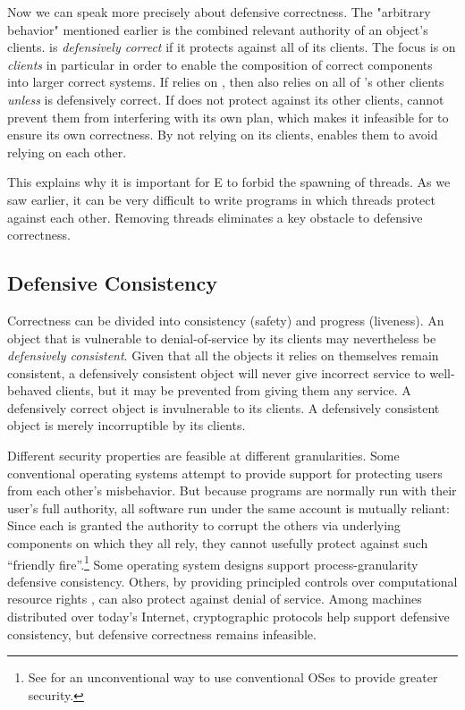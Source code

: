 \documentclass{llncs}
\begin{document}
Now we can speak more precisely about defensive correctness. The
"arbitrary behavior" mentioned earlier is the combined relevant
authority of an object's clients.  is \emph{defensively
correct} if it protects against all of its clients.  The focus is on
\emph{clients} in particular in order to enable the composition of
correct components into larger correct systems. If  relies on
, then  also relies on all of 's other clients
\emph{unless}  is defensively correct.  If  does not
protect against its other clients,  cannot prevent them from
interfering with its own plan, which makes it infeasible for 
to ensure its own correctness.  By not relying on its clients,
 enables them to avoid relying on each other.

This explains why it is important for E to forbid the spawning of
threads.  As we saw earlier, it can be very difficult to write
programs in which threads protect against each other.  Removing
threads eliminates a key obstacle to defensive correctness.

\subsection{Defensive Consistency}

Correctness can be divided into consistency (safety) and progress
(liveness). An object that is vulnerable to denial-of-service by its
clients may nevertheless be \emph{defensively consistent}. Given that
all the objects it relies on themselves remain consistent, a
defensively consistent object will never give incorrect service to
well-behaved clients, but it may be prevented from giving them any
service. A defensively correct object is invulnerable to its
clients. A defensively consistent object is merely incorruptible by
its clients.

Different security properties are feasible at different
granularities. Some conventional operating systems attempt to provide
support for protecting users from each other's misbehavior. But
because programs are normally run with their user's full authority,
all software run under the same account is mutually reliant: Since
each is granted the authority to corrupt the others via underlying
components on which they all rely, they cannot usefully protect
against such ``friendly fire''.\footnote{
%
See \cite{stiegler:polaris} for an unconventional way to use
conventional OSes to provide greater security.}
%
Some operating system designs \cite{dvh} support process-granularity
defensive consistency. Others, by providing principled controls over
computational resource rights \cite{hardy:keykos,shapiro:eros}, can
also protect against denial of service. Among machines distributed
over today's Internet, cryptographic protocols help support defensive
consistency, but defensive correctness remains infeasible.
\end{document}

